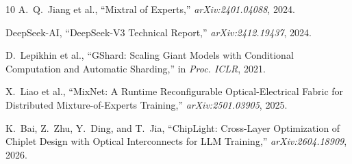 \documentclass[conference]{IEEEtran}
\begin{document}
\begin{thebibliography}{10}
A.~Q.~Jiang et al., ``Mixtral of Experts,'' \textit{arXiv:2401.04088}, 2024.

DeepSeek-AI, ``DeepSeek-V3 Technical Report,'' \textit{arXiv:2412.19437}, 2024.

D.~Lepikhin et al., ``GShard: Scaling Giant Models with Conditional Computation and Automatic Sharding,'' in \textit{Proc. ICLR}, 2021.

X.~Liao et al., ``MixNet: A Runtime Reconfigurable Optical-Electrical Fabric for Distributed Mixture-of-Experts Training,'' \textit{arXiv:2501.03905}, 2025.

K.~Bai, Z.~Zhu, Y.~Ding, and T.~Jia, ``ChipLight: Cross-Layer Optimization of Chiplet Design with Optical Interconnects for LLM Training,'' \textit{arXiv:2604.18909}, 2026.

\end{thebibliography}
\end{document}
